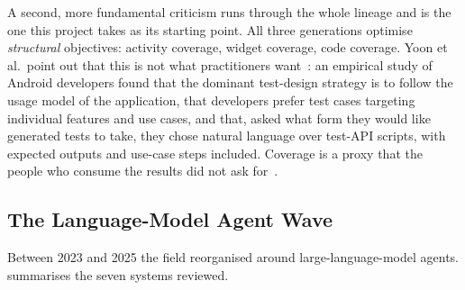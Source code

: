 A second, more fundamental criticism runs through the whole lineage and is the
one this project takes as its starting point. All three generations optimise
\emph{structural} objectives: activity coverage, widget coverage, code coverage.
Yoon et al.\ point out that this is not what practitioners
want~\cite{droidagent}: an empirical study of Android developers found that the
dominant test-design strategy is to follow the usage model of the application,
that developers prefer test cases targeting individual features and use cases,
and that, asked what form they would like generated tests to take, they chose
natural language over test-API scripts, with expected outputs and use-case
steps included. Coverage is a proxy that the people who consume the results did
not ask for~\cite{coppola}.

\subsection{The Language-Model Agent Wave}
\label{subsec:llmwave}

Between 2023 and 2025 the field reorganised around large-language-model agents.
 summarises the seven systems reviewed.

